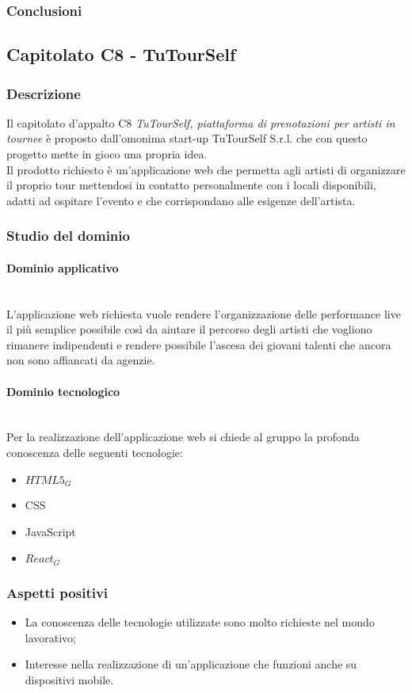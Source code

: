 		\subsubsection{Conclusioni}
	
	\subsection{Capitolato C8 - TuTourSelf}
		\subsubsection{Descrizione}
		Il capitolato d'appalto C8 \emph{TuTourSelf, piattaforma di prenotazioni per artisti in tournee} è proposto dall'omonima start-up TuTourSelf S.r.l. che con questo progetto mette in gioco una propria idea.\\ Il prodotto richiesto è un'applicazione web che permetta agli artisti di organizzare il proprio tour mettendosi in contatto personalmente con i locali disponibili, adatti ad ospitare l'evento e che corrispondano alle esigenze dell'artista. 
		\subsubsection{Studio del dominio}
			\paragraph{Dominio applicativo}
			\mbox{}\\
			L'applicazione web richiesta vuole rendere l’organizzazione delle performance live il più semplice possibile così da aiutare il percorso degli artisti che vogliono rimanere indipendenti e rendere possibile l'ascesa dei giovani talenti che ancora non sono affiancati da agenzie.
			\paragraph{Dominio tecnologico}
			\mbox{}\\
			Per la realizzazione dell'applicazione web si chiede al gruppo la profonda conoscenza delle seguenti tecnologie:
			\begin{itemize}
				\item $HTML5_G$
				\item CSS
				\item JavaScript
				\item $React_G$
			\end{itemize}
		\subsubsection{Aspetti positivi}
		\begin{itemize}
			\item La conoscenza delle tecnologie utilizzate sono molto richieste nel mondo lavorativo;
			\item Interesse nella realizzazione di un'applicazione che funzioni anche su dispositivi mobile.
		\end{itemize}
